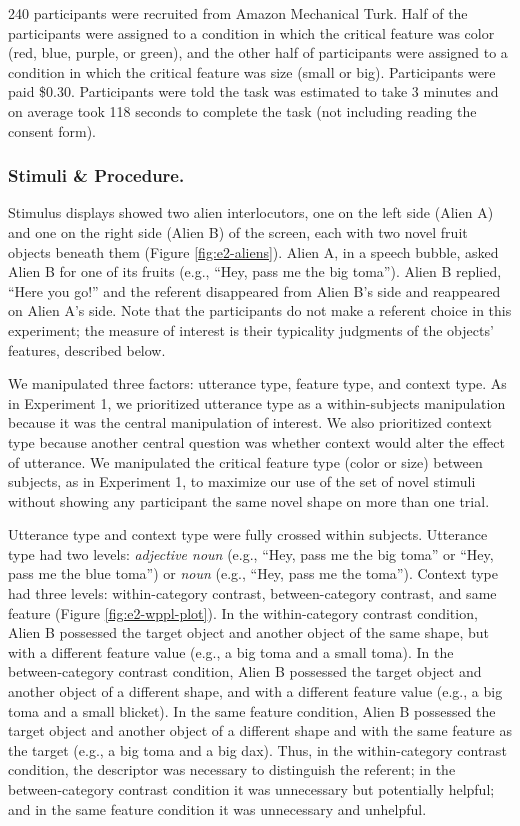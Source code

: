 \documentclass[
  english,
  man,floatsintext]{apa6}
\begin{document}
240 participants were recruited from Amazon Mechanical Turk. Half of the participants were assigned to a condition in which the critical feature was color (red, blue, purple, or green), and the other half of participants were assigned to a condition in which the critical feature was size (small or big). Participants were paid \$0.30. Participants were told the task was estimated to take 3 minutes and on average took 118 seconds to complete the task (not including reading the consent form).

\hypertarget{stimuli-procedure.}{%
\subsubsection{Stimuli \& Procedure.}\label{stimuli-procedure.}}

Stimulus displays showed two alien interlocutors, one on the left side (Alien A) and one on the right side (Alien B) of the screen, each with two novel fruit objects beneath them (Figure \ref{fig:e2-aliens}). Alien A, in a speech bubble, asked Alien B for one of its fruits (e.g., ``Hey, pass me the big toma''). Alien B replied, ``Here you go!'' and the referent disappeared from Alien B's side and reappeared on Alien A's side. Note that the participants do not make a referent choice in this experiment; the measure of interest is their typicality judgments of the objects' features, described below.

We manipulated three factors: utterance type, feature type, and context type. As in Experiment 1, we prioritized utterance type as a within-subjects manipulation because it was the central manipulation of interest. We also prioritized context type because another central question was whether context would alter the effect of utterance. We manipulated the critical feature type (color or size) between subjects, as in Experiment 1, to maximize our use of the set of novel stimuli without showing any participant the same novel shape on more than one trial.

Utterance type and context type were fully crossed within subjects. Utterance type had two levels: \emph{adjective noun} (e.g., ``Hey, pass me the big toma'' or ``Hey, pass me the blue toma'') or \emph{noun} (e.g., ``Hey, pass me the toma''). Context type had three levels: within-category contrast, between-category contrast, and same feature (Figure \ref{fig:e2-wppl-plot}). In the within-category contrast condition, Alien B possessed the target object and another object of the same shape, but with a different feature value (e.g., a big toma and a small toma). In the between-category contrast condition, Alien B possessed the target object and another object of a different shape, and with a different feature value (e.g., a big toma and a small blicket). In the same feature condition, Alien B possessed the target object and another object of a different shape and with the same feature as the target (e.g., a big toma and a big dax). Thus, in the within-category contrast condition, the descriptor was necessary to distinguish the referent; in the between-category contrast condition it was unnecessary but potentially helpful; and in the same feature condition it was unnecessary and unhelpful.
\end{document}

